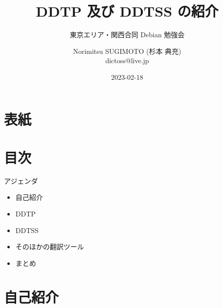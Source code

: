 \title{DDTP 及び DDTSS の紹介}
\subtitle{東京エリア・関西合同 Debian 勉強会} %
\author{Norimitsu SUGIMOTO (杉本 典充) \\dictoss@live.jp}
\date{2023-02-18}



\section{表紙}

\begin{frame}
  \titlepage{}
\end{frame}


\section{目次}

\begin{frame}{アジェンダ}
  \begin{itemize}
  \item 自己紹介
  \item DDTP
  \item DDTSS
  \item そのほかの翻訳ツール
  \item まとめ
  \end{itemize}
\end{frame}


\section{自己紹介}

